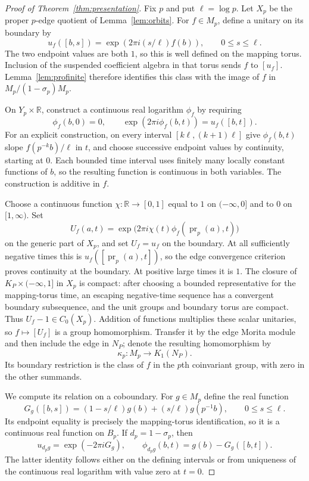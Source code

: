 \documentclass[11pt]{article}
\newcommand{\R}{\mathbb R}
\theoremstyle{definition}
\theoremstyle{remark}
\begin{document}
\begin{proof}[Proof of Theorem~\ref{thm:presentation}]
Fix $p$ and put $\ell=\log p$. Let $X_p$ be the proper $p$-edge quotient of Lemma~\ref{lem:orbits}. For $f\in M_p$, define a unitary on its boundary by
\[
 u_f([b,s])=\exp(2\pi i(s/\ell)f(b)),\qquad0\leq s\leq\ell.
\]
The two endpoint values are both $1$, so this is well defined on the mapping torus. Inclusion of the suspended coefficient algebra in that torus sends $f$ to $[u_f]$. Lemma~\ref{lem:profinite} therefore identifies this class with the image of $f$ in $M_p/(1-\sigma_p)M_p$.

On $Y_p\times\R$, construct a continuous real logarithm $\phi_f$ by requiring
\[
 \phi_f(b,0)=0,\qquad
 \exp(2\pi i\phi_f(b,t))=u_f([b,t]).
\]
For an explicit construction, on every interval $[k\ell,(k+1)\ell]$ give $\phi_f(b,t)$ slope $f(p^{-k}b)/\ell$ in $t$, and choose successive endpoint values by continuity, starting at $0$. Each bounded time interval uses finitely many locally constant functions of $b$, so the resulting function is continuous in both variables. The construction is additive in $f$.

Choose a continuous function $\chi:\R\to[0,1]$ equal to $1$ on $(-\infty,0]$ and to $0$ on $[1,\infty)$. Set
\[
 U_f(a,t)=\exp\bigl(2\pi i\chi(t)\phi_f(\operatorname{pr}_p(a),t)\bigr)
\]
on the generic part of $X_p$, and set $U_f=u_f$ on the boundary. At all sufficiently negative times this is $u_f([\operatorname{pr}_p(a),t])$, so the edge convergence criterion proves continuity at the boundary. At positive large times it is $1$. The closure of $K_P\times(-\infty,1]$ in $X_p$ is compact: after choosing a bounded representative for the mapping-torus time, an escaping negative-time sequence has a convergent boundary subsequence, and the unit groups and boundary torus are compact. Thus $U_f-1\in C_0(X_p)$. Addition of functions multiplies these scalar unitaries, so $f\mapsto[U_f]$ is a group homomorphism. Transfer it by the edge Morita module and then include the edge in $N_P$; denote the resulting homomorphism by
\[
 \kappa_p:M_p\longrightarrow K_1(N_P).
\]
Its boundary restriction is the class of $f$ in the $p$th coinvariant group, with zero in the other summands.

We compute its relation on a coboundary. For $g\in M_p$ define the real function
\[
 G_g([b,s])=(1-s/\ell)g(b)+(s/\ell)g(p^{-1}b),\qquad0\leq s\leq\ell.
\]
Its endpoint equality is precisely the mapping-torus identification, so it is a continuous real function on $B_p$. If $d_p=1-\sigma_p$, then
\[
 u_{d_pg}=\exp(-2\pi iG_g),\qquad
 \phi_{d_pg}(b,t)=g(b)-G_g([b,t]).
\]
The latter identity follows either on the defining intervals or from uniqueness of the continuous real logarithm with value zero at $t=0$.


\end{proof}
\end{document}
